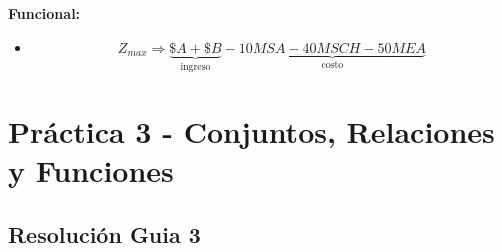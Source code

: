 \documentclass[12pt]{book}
\begin{document}
\pagebreak
\textbf{Funcional:} 
\begin{itemize}
\item \[ Z_{max} \Rightarrow \underbrace{\$ A + \$ B}_{\text{ingreso}} - \underbrace{10 MSA - 40 MSCH - 50 MEA}_{\text{costo}} \]
\end{itemize}





\chapter{Práctica 3 - Conjuntos, Relaciones y Funciones}


\section{Resoluci\'on Guia 3}
\end{document}
